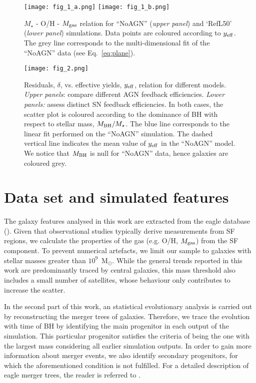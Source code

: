 \documentclass[baaa]{baaa}
\begin{document}
\begin{figure}[!t]
\centering
\texttt{[image: fig\_1\_a.png]}
\texttt{[image: fig\_1\_b.png]}
\caption{$M_\star$ - O/H - $M_{\rm gas}$ relation for ``NoAGN'' (\emph{upper panel}) and `RefL50' (\emph{lower panel}) simulations. Data points are coloured according to $y_{\rm eff}$. The grey line corresponds to the multi-dimensional fit of the ``NoAGN'' data (see Eq.~\ref{eq:plane}).}
\label{Fig:3D_relations}
\end{figure}

\begin{figure*}[!t]
\centering
\texttt{[image: fig\_2.png]}
\caption{Residuals, $\delta$, vs. effective yields, $y_{\rm eff}$, relation for different models. {\em Upper panels}: compare different AGN feedback efficiencies. {\em Lower panels:} assess distinct SN feedback efficiencies. In both cases, the scatter plot is coloured according to the dominance of BH with respect to stellar mass, $M_{\rm BH}/M_\star$. The blue line corresponds to the linear fit performed on the ``NoAGN'' simulation. The dashed vertical line indicates the mean value of $y_{\rm eff}$ in the ``NoAGN'' model. We notice that $M_{\rm BH}$ is null for ``NoAGN'' data, hence galaxies are coloured grey.}
\label{Fig:residue_yeff}
\end{figure*}

\section{Data set and simulated features}
%
The galaxy features analysed in this work are extracted from the {\sc eagle} database (\citealt{McAlpine2016}). Given that observational studies typically derive measurements from SF regions, we calculate the properties of the gas (e.g. O/H, $M_{\rm gas}$) from the SF component. To prevent numerical artefacts, we limit our sample to galaxies with stellar masses greater than $10^9$~M$_\odot$. While the general trends reported in this work are predominantly traced by central galaxies, this mass threshold also includes a small number of satellites, whose behaviour only contributes to increase the scatter.

In the second part of this work, an statistical evolutionary analysis is carried out by reconstructing the merger trees of galaxies. Therefore, we trace the evolution with time of BH by identifying the main progenitor in each output of the simulation. This particular progenitor satisfies the criteria of being the one with the largest mass considering all earlier simulation outputs. In order to gain more information about merger events, we also identify secondary progenitors, for which the aforementioned condition is not fulfilled. For a detailed description of {\sc eagle} merger trees, the reader is referred to \cite{Qu2017}.
\end{document}
